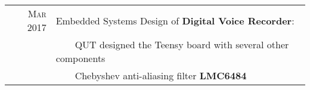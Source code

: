 \documentclass[a4paper,12pt]{article}
\newcommand{\tabitem}{~~\llap{\textbullet}~~}
\begin{document}
\begin{tabular}{rl}
		\textsc{Mar} 2017 & Embedded Systems Design of \textbf{Digital Voice Recorder}: \\
		    & \tabitem QUT designed the Teensy board with several other components \\
		    & \tabitem Chebyshev anti-aliasing filter \textbf{LMC6484} \\ [1pc]
		    
	\end{tabular}
\end{document}
